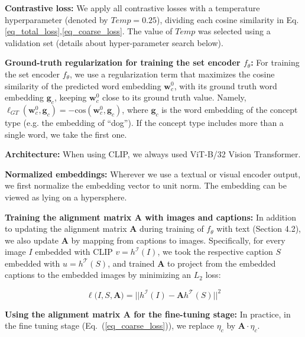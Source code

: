 \documentclass[runningheads]{llncs}
\renewcommand{\eqref}[1]{Eq.~(\ref{#1})}
\newcommand{\cossim}[2]{\text{cos}(#1, #2)}
\renewcommand\vec[1]{\mathbf{#1}}
\newcommand{\ftheta}{f_\theta}
\newcommand{\A}{\vec{A}}
\newcommand{\w}{\vec{w}}
\newcommand{\CLIPI}{h^{\mathcal{I}}}
\newcommand{\CLIPT}{h^{\mathcal{T}}}
\newcommand{\img}{I}
\begin{document}
\vspace{15pt}\noindent\textbf{Contrastive loss:} We apply all contrastive losses with a temperature hyperparameter (denoted by $Temp=0.25$), dividing each cosine similarity in Eq.\ref{eq_total_loss},\ref{eq_coarse_loss}. The value of $Temp$ was selected using a validation set (details about hyper-parameter search below).




\vspace{15pt}\noindent\textbf{Ground-truth regularization for training the set encoder $\ftheta$:}
For training the set encoder $\ftheta$, we use a regularization term that maximizes the cosine similarity of the predicted word embedding $\w^0_c$, with its ground truth word embedding $\vec{g}_c$, keeping $\w^0_c$ close to its ground truth value.
Namely, $\ell_{GT}(\w_c^0, \vec{g}_c) = -\cossim{\w_c^0}{\vec{g}_c}$, where $\vec{g}_c$ is the word embedding of the concept type  (e.g. the embedding of  ``dog''). If the concept type includes more than a single word, we take the first one.

\vspace{15pt}\noindent\textbf{Architecture:} When using CLIP, we always used  ViT-B/32 Vision Transformer.

\vspace{15pt}\noindent\textbf{Normalized embeddings:}
Wherever we use a textual or visual encoder output, we first normalize the embedding vector to unit norm. The embedding can be viewed as lying on a hypersphere.


\vspace{15pt}\noindent\textbf{Training the alignment matrix $\A$ with images and captions:}
In addition to updating the alignment matrix $\A$ during training of $\ftheta$ with text (Section 4.2), we also update $\A$ by mapping from captions to images.
Specifically, for every image $\img$ embedded with CLIP $v = \CLIPI(\img)$, we took the respective caption $S$ embedded with $u = \CLIPT(S)$, and trained $\A$ to project from the embedded captions to the embedded images by minimizing an $L_2$ loss:

\small
\begin{equation} \label{eq:alignment_loss}
    \ell\big(\img,S,\A\big) = || \CLIPI(\img) - \A  \CLIPT(S)  ||^2
\end{equation}


\vspace{15pt}\noindent\textbf{Using the alignment matrix $\A$ for the fine-tuning stage:} 
In practice, in the  fine tuning stage (\eqref{eq_coarse_loss}), we replace $\eta_c$ by $\A \cdot \eta_c$.
\end{document}
